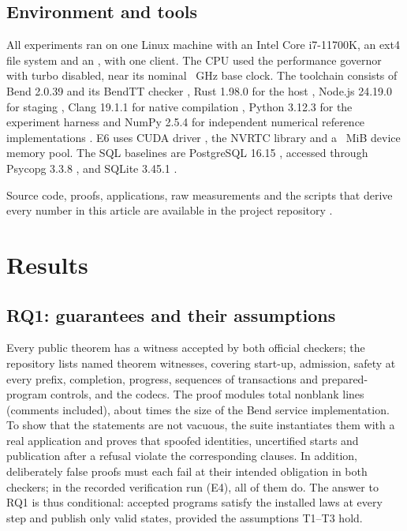 \documentclass[12pt]{article}
\newcommand{\whole}[1]{\pgfmathprintnumber[fixed,precision=0,1000 sep={\mathord{,}}]{#1}}
\begin{document}
\subsection{Environment and tools}
\begin{sloppypar}
All experiments ran on one Linux machine with an Intel Core i7-11700K, an ext4
file system and an \GpuDevice{}, with one client. The CPU used the performance
governor with turbo disabled, near its nominal \CpuClockGHz{}~GHz base clock.
The toolchain consists of Bend 2.0.39 and its BendTT checker \cite{bend},
Rust 1.98.0 for the host \cite{rust}, Node.js 24.19.0 for staging \cite{node},
Clang 19.1.1 for native compilation \cite{clang}, Python 3.12.3 for the
experiment harness \cite{python} and NumPy 2.5.4 for independent numerical reference implementations
\cite{numpy}. E6 uses CUDA driver \GpuDriverVersion{}, the NVRTC library
\NvrtcLibraryVersion{} \cite{cuda,nvrtc} and a \GpuCorpusMiB{}~MiB device memory
pool. The SQL baselines are PostgreSQL 16.15 \cite{postgresrls}, accessed
through Psycopg 3.3.8 \cite{psycopg}, and SQLite 3.45.1 \cite{sqlite}.
\end{sloppypar}

Source code, proofs, applications, raw measurements and the scripts that derive
every number in this article are available in the project repository
\cite{artifact}.

\section{Results}
\label{sec:results}
\subsection{RQ1: guarantees and their assumptions}
Every public theorem has a witness accepted by both official checkers; the
repository lists \PublicTheoremWitnesses{} named theorem witnesses, covering
start-up, admission, safety at every prefix, completion, progress, sequences of
transactions and prepared-program controls, and the codecs. The proof modules total
\ProofNonblankLines{} nonblank lines (comments included), about \whole{\ProofToImplementationRatio}
times the size of the Bend service implementation. To show that the
statements are not vacuous, the suite instantiates them with a real application
and proves that spoofed identities, uncertified starts and publication after a
refusal violate the corresponding clauses. In addition, \NegativeFixtures{}
deliberately false proofs must each fail at their intended obligation in both
checkers; in the recorded verification run (E4), all of them do. The answer to RQ1 is thus conditional: accepted
programs satisfy the installed laws at every step and publish only valid states,
provided the assumptions T1--T3 hold.
\end{document}
